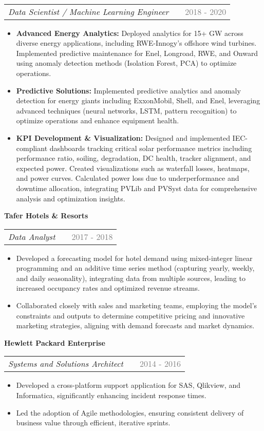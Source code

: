 \documentclass[a4paper,12pt]{article}
\makeatletter
\newenvironment{joblong}[3]
    {
    \noindent\textbf{\large #1}\\ %
    \begin{tabularx}{\linewidth}{@{}l X r@{}}
    \textit{#2} & &  {\textcolor{gray}{#3}} \\[3.75pt] %
    \end{tabularx}
    \begin{minipage}[t]{\linewidth}
    \begin{itemize}[nosep,after=\strut, leftmargin=1em, itemsep=3pt,label=--]
    }
    {
    \end{itemize}
    \end{minipage}    
    }
\makeatother
\begin{document}
\begin{joblong}{}{Data Scientist / Machine Learning Engineer}{2018 - 2020}
    \item \textbf{Advanced Energy Analytics:} Deployed analytics for 15+ GW across diverse energy applications, including RWE-Innogy's offshore wind turbines. Implemented predictive maintenance for Enel, Longroad, RWE, and Onward using anomaly detection methods (Isolation Forest, PCA) to optimize operations.
    \item \textbf{Predictive Solutions:} Implemented predictive analytics and anomaly detection for energy giants including ExxonMobil, Shell, and Enel, leveraging advanced techniques (neural networks, LSTM, pattern recognition) to optimize operations and enhance equipment health.
    \item \textbf{KPI Development \& Visualization:} Designed and implemented IEC-compliant dashboards tracking critical solar performance metrics including performance ratio, soiling, degradation, DC health, tracker alignment, and expected power. Created visualizations such as waterfall losses, heatmaps, and power curves. Calculated power loss due to underperformance and downtime allocation, integrating PVLib and PVSyst data for comprehensive analysis and optimization insights.
\end{joblong}

\begin{joblong}{Tafer Hotels \&  Resorts }{Data Analyst}{2017 - 2018}
    \item Developed a forecasting model for hotel demand using mixed-integer linear programming and an additive time series method (capturing yearly, weekly, and daily seasonality), integrating data from multiple sources, leading to increased occupancy rates and optimized revenue streams.
    \item Collaborated closely with sales and marketing teams, employing the model's constraints and outputs to determine competitive pricing and innovative marketing strategies, aligning with demand forecasts and market dynamics.
\end{joblong}

\begin{joblong}{Hewlett Packard Enterprise}{Systems and Solutions Architect}{2014 - 2016}
    \item Developed a cross-platform support application for SAS, Qlikview, and Informatica, significantly enhancing incident response times.
    \item Led the adoption of Agile methodologies, ensuring consistent delivery of business value through efficient, iterative sprints.
\end{joblong}
    
\end{document}
